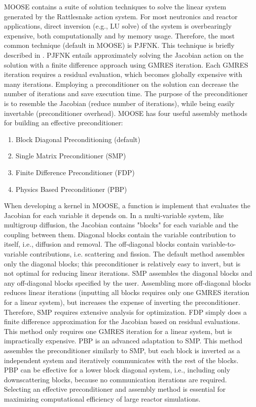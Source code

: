 MOOSE contains a suite of solution techniques to solve the linear system generated by the Rattlesnake action system. For most neutronics and reactor applications, direct inversion (e.g., LU solve) of the system is overbearingly expensive, both computationally and by memory usage. Therefore, the most common technique (default in MOOSE) is PJFNK. This technique is briefly described in . PJFNK entails approximately solving the Jacobian action on the solution with a finite difference approach using GMRES iteration. Each GMRES iteration requires a residual evaluation, which becomes globally expensive with many iterations. Employing a preconditioner on the solution can decrease the number of iterations and save execution time. The purpose of the preconditioner is to resemble the Jacobian (reduce number of iterations), while being easily invertable (preconditioner overhead). MOOSE has four useful assembly methods for building an effective preconditioner:

\begin{enumerate}
\item Block Diagonal Preconditioning (default)
\item Single Matrix Preconditioner (SMP)
\item Finite Difference Preconditioner (FDP)
\item Physics Based Preconditioner (PBP)
\end{enumerate}

When developing a kernel in MOOSE, a function is implement that evaluates the Jacobian for each variable it depends on. In a multi-variable system, like multigroup diffusion, the Jacobian contains "blocks" for each variable and the coupling between them. Diagonal blocks contain the variable contribution to itself, i.e., diffusion and removal. The off-diagonal blocks contain variable-to-variable contributions, i.e. scattering and fission. The default method assembles only the diagonal blocks; this preconditioner is relatively easy to invert, but is not optimal for reducing linear iterations. SMP assembles the diagonal blocks and any off-diagonal blocks specified by the user. Assembling more off-diagonal blocks reduces linear iterations (inputting all blocks requires only one GMRES iteration for a linear system), but increases the expense of inverting the preconditioner. Therefore, SMP requires extensive analysis for optimization. FDP simply does a finite difference approximation for the Jacobian based on residual evaluations. This method only requires one GMRES iteration for a linear system, but is impractically expensive. PBP is an advanced adaptation to SMP. This method assembles the preconditioner similarly to SMP, but each block is inverted as a independent system and iteratively communicates with the rest of the blocks. PBP can be effective for a lower block diagonal system, i.e., including only downscattering blocks, because no communication iterations are required. Selecting an effective preconditioner and assembly method is essential for maximizing computational efficiency of large reactor simulations.

